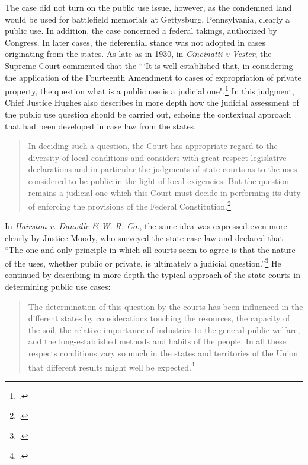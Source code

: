 \documentclass[12pt,a4paper]{book} %
\begin{document}
The case did not turn on the public use issue, however, as the condemned land would be used for battlefield memorials at Gettysburg, Pennsylvania, clearly a public use. In addition, the case concerned a federal takings, authorized by Congress. In later cases, the deferential stance was not adopted in cases originating from the states. As late as in 1930, in {\it Cincinatti v Vester}, the Supreme Court commented that the ``‘It is well established that, in considering the application of the Fourteenth Amendment to cases of expropriation of private property, the question what is a public use is a judicial one".\footcite[447]{vester30} In this judgment, Chief Justice Hughes also describes in more depth how the judicial assessment of the public use question should be carried out, echoing the contextual approach that had been developed in case law from the states.

\begin{quote}
In deciding such a question, the Court has appropriate regard to the diversity of local conditions and considers with great respect legislative declarations and in particular the judgments of state courts as to the uses considered to be public in the light of local exigencies. But the question remains a judicial one which this Court must decide in performing its duty of enforcing the provisions of the Federal Constitution.\footcite[447]{vester30}
\end{quote}

In {\it Hairston v. Danville \& W. R. Co.}, the same idea was expressed even more clearly by Justice Moody, who surveyed the state case law and declared that ``The one and only principle in which all courts seem to agree is that the nature of the uses, whether public or private, is ultimately a judicial question.''\footcite[606]{hairston08} He continued by describing in more depth the typical approach of the state courts in determining public use cases:

\begin{quote}
The determination of this question by the courts has been influenced in the different states by considerations touching the resources, the capacity of the soil, the relative importance of industries to the general public welfare, and the long-established methods and habits of the people. In all these respects conditions vary so much in the states and territories of the Union that different results might well be expected.\footcite[606]{hairston08}
\end{quote}
\end{document}
